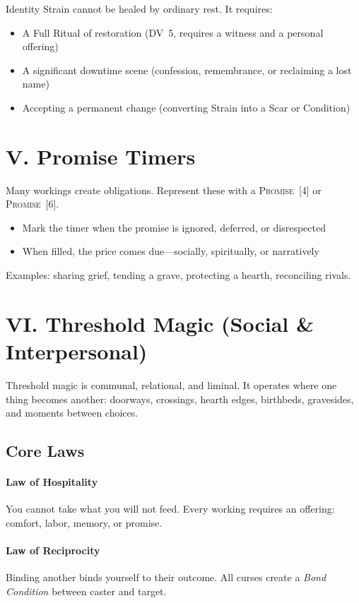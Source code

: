 \documentclass[11pt,letterpaper]{article}
\newcommand{\dv}[1]{\textsc{DV}~#1}
\newcommand{\timer}[2]{\textsc{#1}~[#2]}
\begin{document}
Identity Strain cannot be healed by ordinary rest. It requires:
\begin{itemize}
    \item A Full Ritual of restoration (\dv{5}, requires a witness and a personal offering)
    \item A significant downtime scene (confession, remembrance, or reclaiming a lost name)
    \item Accepting a permanent change (converting Strain into a Scar or Condition)
\end{itemize}

\section{V. Promise Timers}

Many workings create obligations. Represent these with a \timer{Promise}{4} or \timer{Promise}{6}.

\begin{itemize}
    \item Mark the timer when the promise is ignored, deferred, or disrespected
    \item When filled, the price comes due---socially, spiritually, or narratively
\end{itemize}

Examples: sharing grief, tending a grave, protecting a hearth, reconciling rivals.

\section{VI. Threshold Magic (Social \& Interpersonal)}

Threshold magic is communal, relational, and liminal. It operates where one thing becomes another: doorways, crossings, hearth edges, birthbeds, gravesides, and moments between choices.

\subsection{Core Laws}

\paragraph{Law of Hospitality} You cannot take what you will not feed. Every working requires an offering: comfort, labor, memory, or promise.

\paragraph{Law of Reciprocity} Binding another binds yourself to their outcome. All curses create a \textit{Bond Condition} between caster and target.
\end{document}
